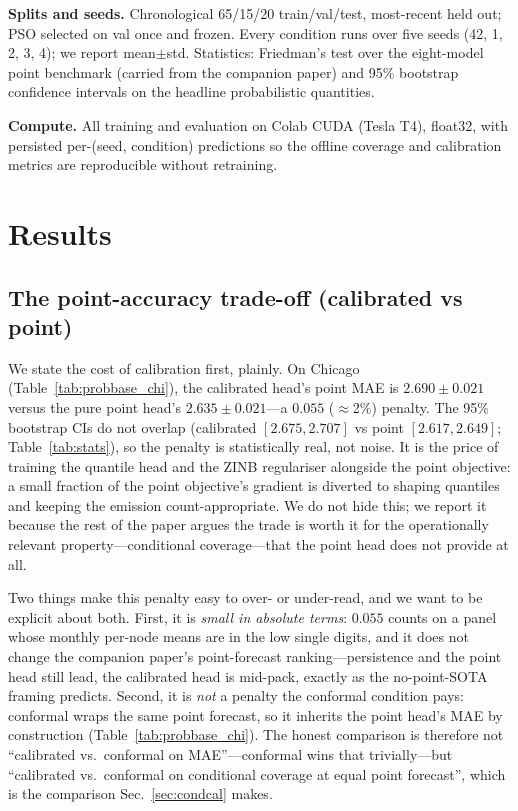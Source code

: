 \documentclass[11pt,conference]{IEEEtran}
\begin{document}
\textbf{Splits and seeds.} Chronological 65/15/20 train/val/test, most-recent
held out; PSO selected on val once and frozen. Every condition runs over five
seeds (42, 1, 2, 3, 4); we report mean$\pm$std. Statistics: Friedman's test over
the eight-model point benchmark (carried from the companion paper) and 95\%
bootstrap confidence intervals on the headline probabilistic quantities.

\textbf{Compute.} All training and evaluation on Colab CUDA (Tesla T4), float32,
with persisted per-(seed, condition) predictions so the offline coverage and
calibration metrics are reproducible without retraining.

\section{Results}\label{sec:results}

\subsection{The point-accuracy trade-off (calibrated vs point)}\label{sec:tradeoff}
We state the cost of calibration first, plainly. On Chicago (Table~\ref{tab:probbase_chi}),
the calibrated head's point MAE is $2.690\pm0.021$ versus the pure point head's
$2.635\pm0.021$---a $0.055$ ($\approx$2\%) penalty. The 95\% bootstrap CIs do not
overlap (calibrated $[2.675,2.707]$ vs point $[2.617,2.649]$; Table~\ref{tab:stats}),
so the penalty is statistically real, not noise. It is the price of training the
quantile head and the ZINB regulariser alongside the point objective: a small
fraction of the point objective's gradient is diverted to shaping quantiles and
keeping the emission count-appropriate. We do not hide this; we report it because
the rest of the paper argues the trade is worth it for the operationally relevant
property---conditional coverage---that the point head does not provide at all.

Two things make this penalty easy to over- or under-read, and we want to be
explicit about both. First, it is \emph{small in absolute terms}: $0.055$ counts
on a panel whose monthly per-node means are in the low single digits, and it
does not change the companion paper's point-forecast ranking---persistence and
the point head still lead, the calibrated head is mid-pack, exactly as the
no-point-SOTA framing predicts. Second, it is \emph{not} a penalty the conformal
condition pays: conformal wraps the same point forecast, so it inherits the
point head's MAE by construction (Table~\ref{tab:probbase_chi}). The honest
comparison is therefore not ``calibrated vs.\ conformal on MAE''---conformal
wins that trivially---but ``calibrated vs.\ conformal on conditional coverage at
equal point forecast'', which is the comparison Sec.~\ref{sec:condcal} makes.
\end{document}
